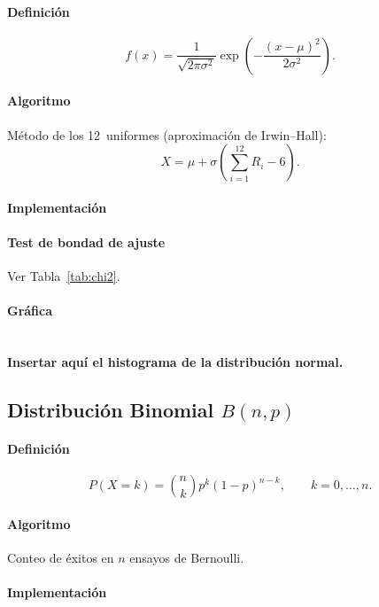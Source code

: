 \documentclass[11pt,a4paper]{article}
\begin{document}
\paragraph{Definición}
\[
f(x)=\frac{1}{\sqrt{2\pi\sigma^{2}}}
      \exp\!\left(-\frac{(x-\mu)^{2}}{2\sigma^{2}}\right).
\]

\paragraph{Algoritmo}
Método de los 12~uniformes (aproximación de Irwin–Hall):
\[
X = \mu + \sigma\left(\sum_{i=1}^{12}R_i - 6\right).
\]

\paragraph{Implementación}


\paragraph{Test de bondad de ajuste}
Ver Tabla~\ref{tab:chi2}.

\paragraph{Gráfica}\\
\textbf{Insertar aquí el histograma de la distribución normal.}

\subsection{Distribución Binomial $B(n,p)$}
\paragraph{Definición}
\[
P(X=k)=\binom{n}{k}p^{k}(1-p)^{n-k}, \qquad k=0,\dots,n .
\]

\paragraph{Algoritmo}
Conteo de éxitos en $n$ ensayos de Bernoulli.

\paragraph{Implementación}

\end{document}
